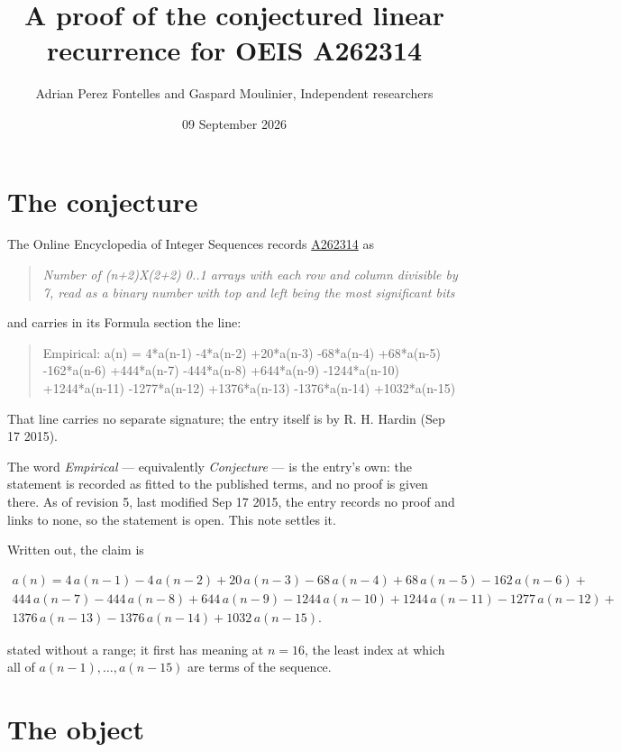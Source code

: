 \documentclass[11pt]{article}
\title{A proof of the conjectured linear recurrence for OEIS A262314}
\author{Adrian Perez Fontelles and Gaspard Moulinier, Independent researchers}
\date{09 September 2026}
\theoremstyle{definition}
\begin{document}
\maketitle
\section{The conjecture}

The Online Encyclopedia of Integer Sequences records \href{https://oeis.org/A262314}{A262314} as

\begin{quote}\itshape Number of (n+2)X(2+2) 0..1 arrays with each row and column divisible by 7, read as a binary number with top and left being the most significant bits\end{quote}

and carries in its Formula section the line:

\begin{quote}\ttfamily Empirical: a(n) = 4*a(n-1) -4*a(n-2) +20*a(n-3) -68*a(n-4) +68*a(n-5) -162*a(n-6) +444*a(n-7) -444*a(n-8) +644*a(n-9) -1244*a(n-10) +1244*a(n-11) -1277*a(n-12) +1376*a(n-13) -1376*a(n-14) +1032*a(n-15)\end{quote}

That line carries no separate signature; the entry itself is by R. H. Hardin (Sep 17 2015).

The word {\itshape Empirical} --- equivalently {\itshape Conjecture} --- is the entry's own: the statement is recorded as fitted to the published terms, and no proof is given there. As of revision 5, last modified Sep 17 2015, the entry records no proof and links to none, so the statement is open. This note settles it.

Written out, the claim is

\begin{multline*} a(n) = 4\,a(n-1) - 4\,a(n-2) + 20\,a(n-3) - 68\,a(n-4) + 68\,a(n-5) - 162\,a(n-6) + \\ 444\,a(n-7) - 444\,a(n-8) + 644\,a(n-9) - 1244\,a(n-10) + 1244\,a(n-11) - 1277\,a(n-12) + \\ 1376\,a(n-13) - 1376\,a(n-14) + 1032\,a(n-15). \end{multline*}

stated without a range; it first has meaning at $n = 16$, the least index at which all of $a(n-1),\dots,a(n-15)$ are terms of the sequence.

\section{The object}
\end{document}
